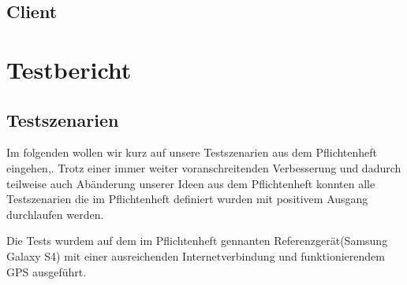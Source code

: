 \documentclass{scrartcl}
\begin{document}
\subsection{Client}
\newpage
\section{Testbericht}
\subsection{Testszenarien}
Im folgenden wollen wir kurz auf unsere Testszenarien aus dem Pflichtenheft eingehen,.
Trotz einer immer weiter voranschreitenden Verbesserung und dadurch teilweise auch Abänderung unserer Ideen aus dem Pflichtenheft konnten alle Testszenarien die im Pflichtenheft definiert wurden mit positivem Ausgang durchlaufen werden.

Die Tests wurdem auf dem im Pflichtenheft gennanten Referenzgerät(Samsung Galaxy S4) mit einer ausreichenden Internetverbindung und funktionierendem GPS ausgeführt. \newline
\end{document}
